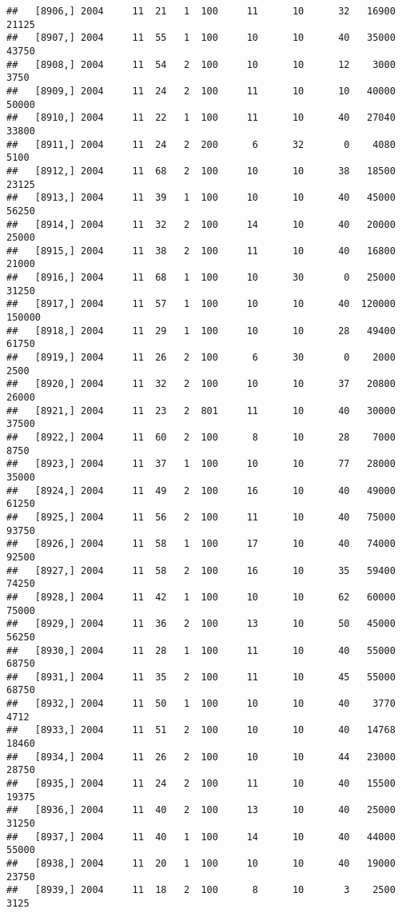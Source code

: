 \documentclass{article}\usepackage[]{graphicx}\usepackage[]{color}
\makeatletter
\newenvironment{kframe}{%
 \def\at@end@of@kframe{}%
 \ifinner\ifhmode%
  \def\at@end@of@kframe{\end{minipage}}%
  \begin{minipage}{\columnwidth}%
 \fi\fi%
 \def\FrameCommand##1{\hskip\@totalleftmargin \hskip-\fboxsep
 \colorbox{shadecolor}{##1}\hskip-\fboxsep
     \hskip-\linewidth \hskip-\@totalleftmargin \hskip\columnwidth}%
 \MakeFramed {\advance\hsize-\width
   \@totalleftmargin\z@ \linewidth\hsize
   \@setminipage}}%
 {\par\unskip\endMakeFramed%
 \at@end@of@kframe}
\newenvironment{knitrout}{}{} %
\makeatother
\begin{document}
\begin{knitrout}
\begin{kframe}
\begin{verbatim}
##   [8906,] 2004     11  21   1  100     11      10      32   16900   21125
##   [8907,] 2004     11  55   1  100     10      10      40   35000   43750
##   [8908,] 2004     11  54   2  100     10      10      12    3000    3750
##   [8909,] 2004     11  24   2  100     11      10      10   40000   50000
##   [8910,] 2004     11  22   1  100     11      10      40   27040   33800
##   [8911,] 2004     11  24   2  200      6      32       0    4080    5100
##   [8912,] 2004     11  68   2  100     10      10      38   18500   23125
##   [8913,] 2004     11  39   1  100     10      10      40   45000   56250
##   [8914,] 2004     11  32   2  100     14      10      40   20000   25000
##   [8915,] 2004     11  38   2  100     11      10      40   16800   21000
##   [8916,] 2004     11  68   1  100     10      30       0   25000   31250
##   [8917,] 2004     11  57   1  100     10      10      40  120000  150000
##   [8918,] 2004     11  29   1  100     10      10      28   49400   61750
##   [8919,] 2004     11  26   2  100      6      30       0    2000    2500
##   [8920,] 2004     11  32   2  100     10      10      37   20800   26000
##   [8921,] 2004     11  23   2  801     11      10      40   30000   37500
##   [8922,] 2004     11  60   2  100      8      10      28    7000    8750
##   [8923,] 2004     11  37   1  100     10      10      77   28000   35000
##   [8924,] 2004     11  49   2  100     16      10      40   49000   61250
##   [8925,] 2004     11  56   2  100     11      10      40   75000   93750
##   [8926,] 2004     11  58   1  100     17      10      40   74000   92500
##   [8927,] 2004     11  58   2  100     16      10      35   59400   74250
##   [8928,] 2004     11  42   1  100     10      10      62   60000   75000
##   [8929,] 2004     11  36   2  100     13      10      50   45000   56250
##   [8930,] 2004     11  28   1  100     11      10      40   55000   68750
##   [8931,] 2004     11  35   2  100     11      10      45   55000   68750
##   [8932,] 2004     11  50   1  100     10      10      40    3770    4712
##   [8933,] 2004     11  51   2  100     10      10      40   14768   18460
##   [8934,] 2004     11  26   2  100     10      10      44   23000   28750
##   [8935,] 2004     11  24   2  100     11      10      40   15500   19375
##   [8936,] 2004     11  40   2  100     13      10      40   25000   31250
##   [8937,] 2004     11  40   1  100     14      10      40   44000   55000
##   [8938,] 2004     11  20   1  100     10      10      40   19000   23750
##   [8939,] 2004     11  18   2  100      8      10       3    2500    3125

\end{verbatim}
\end{kframe}
\end{knitrout}
\end{document}
